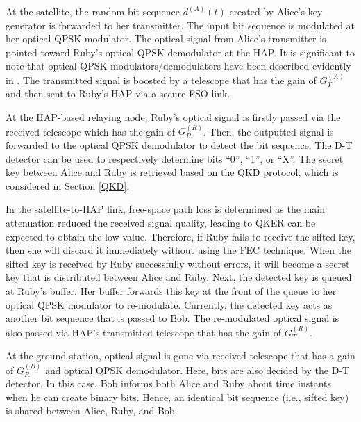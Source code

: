 \documentclass[conference]{IEEEtran}
\begin{document}
At the satellite, the random bit sequence $d^{(A)}(t)$ created by Alice's key generator is forwarded to her transmitter. The input bit sequence is modulated at her optical QPSK modulator. The optical signal from Alice's transmitter is pointed toward Ruby's optical QPSK demodulator at the HAP. It is significant to note that optical QPSK modulators/demodulators have been described evidently in \cite{MinhVu2019}. The transmitted signal is boosted by a telescope that has the gain of $G_T^{(A)}$ and then sent to Ruby's HAP via a secure FSO link.

At the HAP-based relaying node, Ruby's optical signal is firstly passed via the received telescope which has the gain of $G_R^{(R)}$. Then, the outputted signal is forwarded to the optical QPSK demodulator to detect the bit sequence. The D-T detector can be used to respectively determine bits \enquote{0}, \enquote{1}, or \enquote{X}. The secret key between Alice and Ruby is retrieved based on the QKD protocol, which is considered in Section \ref{QKD}. 

In the satellite-to-HAP link, free-space path loss is determined as the main attenuation reduced the received signal quality, leading to QKER can be expected to obtain the low value. Therefore, if Ruby fails to receive the sifted key, then she will discard it immediately without using the FEC technique. When the sifted key is received by Ruby successfully without errors, it will become a secret key that is distributed between Alice and Ruby. Next, the detected key is queued at Ruby's buffer. Her buffer forwards this key at the front of the queue to her optical QPSK modulator to re-modulate. Currently, the detected key acts as another bit sequence that is passed to Bob. The re-modulated optical signal is also passed via HAP's transmitted telescope that has the gain of $G_T^{(R)}$. 

At the ground station, optical signal is gone via received telescope that has a gain of $G_R^{(B)}$ and optical QPSK demodulator. Here, bits are also decided by the D-T detector. In this case, Bob informs both Alice and Ruby about time instants when he can create binary bits. Hence, an identical bit sequence (i.e., sifted key) is shared between Alice, Ruby, and Bob. 
\end{document}
